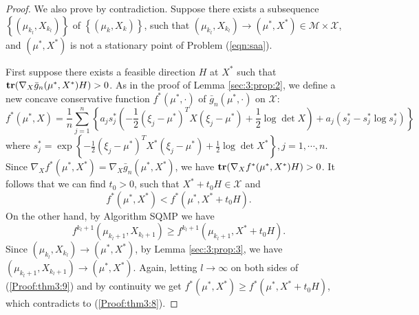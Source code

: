 \begin{proof}
We also prove by contradiction. Suppose there exists a subsequence
$\left\{(\mu_{k_l},X_{k_l})\right\}$ of $\left\{(\mu_k,X_k)
\right\}$, such that $(\mu_{k_l},X_{k_l})\to (\mu^*,X^*)\in
\mathcal{M}\times\mathcal{X}$, and $(\mu^*,X^*)$ is not a stationary
point of Problem (\ref{eqn:saa}).

First suppose there exists a feasible direction $H$ at $X^*$ such
that ${\bf tr}(\nabla_X \bar g_n(\mu^*,X^*)H)>0$. As in the proof of
Lemma \ref{sec:3:prop:2}, we define a new concave conservative
function $f^*(\mu^*,\cdot)$ of $\bar g_n(\mu^*,\cdot)$ on
$\mathcal{X}$:
\begin{equation*}
f^*(\mu^*,X)=\frac{1}{n}\sum_{j=1}^n
\left\{a_js_j^*\left(-\frac{1}{2}(\xi_j-\mu^*)^TX(\xi_j-\mu^*)
+\frac{1}{2}\log\det X\right)+a_j\left(s_j^*-s_j^*\log
s_j^*\right)\right\}
\end{equation*}
where $s_j^*=\exp\left\{-\frac{1}{2}(\xi_j-\mu^*)^TX^*(\xi_j-\mu^*)+
\frac{1}{2}\log\det X^*\right\}, j=1,\cdots,n$. Since $\nabla_X
f^*(\mu^*,X^*)=\nabla_X \bar g_n(\mu^*,X^*)$, we have ${\bf
tr}(\nabla_X f^*(\mu^*,X^*)H)>0$. It follows that we can find
$t_0>0$, such that $X^*+t_0H\in \mathcal{X}$ and
\begin{equation}\label{Proof:thm3:8}
f^*(\mu^*,X^*)<f^*(\mu^*,X^*+t_0H).
\end{equation}
On the other hand, by Algorithm SQMP we have
\begin{equation}\label{Proof:thm3:9}
f^{k_l+1}(\mu_{k_l+1},X_{k_l+1})\ge f^{k_l+1}(\mu_{k_l+1},X^*+t_0H).
\end{equation}
Since $(\mu_{k_l},X_{k_l})\to (\mu^*,X^*)$, by Lemma
\ref{sec:3:prop:3}, we have $(\mu_{k_l+1},X_{k_l+1})\to
(\mu^*,X^*)$. Again, letting $l\to \infty$ on both sides of
(\ref{Proof:thm3:9}) and by continuity we get $f^*(\mu^*,X^*)\ge
f^*(\mu^*,X^*+t_0H)$, which contradicts to (\ref{Proof:thm3:8}).


\end{proof}
